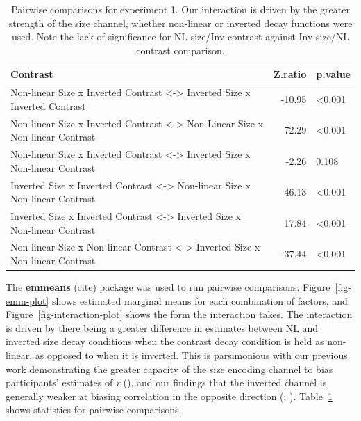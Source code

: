 \documentclass[manuscript, review, anonymous, screen]{acmart}
\begin{document}
\hypertarget{tbl-contrasts}{}
\begin{table}
\caption{\label{tbl-contrasts}Pairwise comparisons for experiment 1. Our interaction is driven by the
greater strength of the size channel, whether non-linear or inverted
decay functions were used. Note the lack of significance for NL size/Inv
contrast against Inv size/NL contrast comparison. }\tabularnewline

\centering
\begin{tabular}{lrl}
\toprule
Contrast & Z.ratio & p.value\\
\midrule
Non-linear Size x Inverted Contrast <-> Inverted Size x Inverted Contrast & -10.95 & <0.001\\
Non-linear Size x Inverted Contrast <-> Non-Linear Size x Non-linear Contrast & 72.29 & <0.001\\
Non-linear Size x Inverted Contrast <-> Inverted Size x Non-linear Contrast & -2.26 & 0.108\\
Inverted Size x Inverted Contrast <-> Non-linear Size x Non-linear Contrast & 46.13 & <0.001\\
Inverted Size x Inverted Contrast <-> Inverted Size x Non-linear Contrast & 17.84 & <0.001\\
\addlinespace
Non-linear Size x Non-linear Contrast <-> Inverted Size x Non-linear Contrast & -37.44 & <0.001\\
\bottomrule
\end{tabular}
\end{table}

The \textbf{emmeans} (cite) package was used to run pairwise
comparisons. Figure~\ref{fig-emm-plot} shows estimated marginal means
for each combination of factors, and Figure~\ref{fig-interaction-plot}
shows the form the interaction takes. The interaction is driven by there
being a greater difference in estimates between NL and inverted size
decay conditions when the contrast decay condition is held as
non-linear, as opposed to when it is inverted. This is parsimonious with
our previous work demonstrating the greater capacity of the size
encoding channel to bias participants' estimates of \emph{r}
(\citet{strain_2023b}), and our findings that the inverted channel is
generally weaker at biasing correlation in the opposite direction
(\citet{strain_2023}; \citet{strain_2023b}). Table~\ref{tbl-contrasts}
shows statistics for pairwise comparisons.
\end{document}
